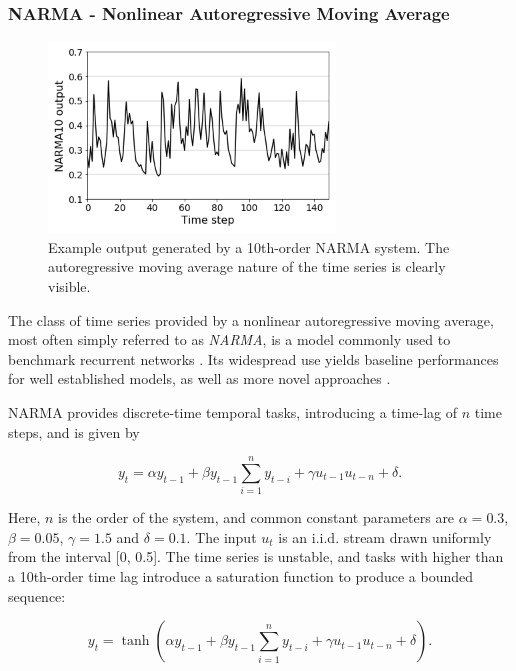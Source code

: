 \subsubsection{NARMA - Nonlinear Autoregressive Moving Average}

\begin{figure}[t!]
  \centering
  \includegraphics[width=3.0in]{figures/NARMA10.png}
  \caption{
    Example output generated by a 10th-order NARMA system. The autoregressive
moving average nature of the time series is clearly visible.
  }
  \label{narma10-fig}
\end{figure}

The class of time series provided by a nonlinear autoregressive moving average,
most often simply referred to as \textit{NARMA}, is a model commonly used to
benchmark recurrent networks \cite{atiya_new_2000}. Its widespread use yields
baseline performances for well established models, as well as more novel
approaches \cite{verstraeten_experimental_2007, appeltant_information_2011}.

NARMA provides discrete-time temporal tasks, introducing a time-lag of $n$ time
steps, and is given by

\begin{equation}
  y_{t} = \alpha y_{t-1} +
  \beta y_{t-1} \sum_{i=1}^{n}y_{t-i} +
  \gamma u_{t-1}u_{t-n} +
  \delta.
  \label{narma-eq}
\end{equation}

Here, $n$ is the order of the system, and common constant parameters are $\alpha
= 0.3$, $\beta = 0.05$, $\gamma = 1.5$ and $\delta = 0.1$. The input $u_{t}$ is
an i.i.d. stream drawn uniformly from the interval [0, 0.5]. The time series is
unstable, and tasks with higher than a 10th-order time lag introduce a
saturation function to produce a bounded sequence:

\begin{equation}
  y_{t} =
  \tanh(
  \alpha y_{t-1} +
  \beta y_{t-1} \sum_{i=1}^{n}y_{t-i} +
  \gamma u_{t-1}u_{t-n} +
  \delta
  ).
  \label{narma-tanh-eq}
\end{equation}

